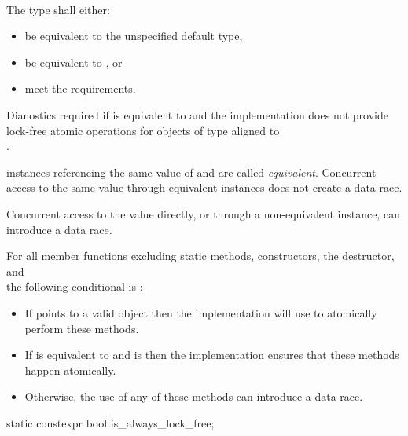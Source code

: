  \\

\begin{addedblock}
\pnum
The type  shall either:
\begin{itemize}
\item be equivalent to the unspecified default type,
\item be equivalent to , or
\item meet the  requirements.
\end{itemize}
Dianostics required if  is equivalent to  
and the implementation does not provide lock-free atomic
operations for objects of type  aligned to \\
.

\pnum
{} instances referencing the same value of  and  are 
called \textit{equivalent}. Concurrent access to the same value through 
equivalent  instances does not create a data race. 
\begin{note} Concurrent access to the value directly, or through a non-equivalent
 instance, can introduce a data race.
\end{note}

\pnum
For all  member functions excluding static methods, constructors, 
the destructor, and \\  the following conditional is :
\begin{itemize}
\item If  points to a valid  object then 
  the implementation will use  to atomically perform these methods.
\item If  is equivalent to  and
   is  then
  the implementation ensures that these methods happen atomically.
\item Otherwise, the use of any of these methods can introduce a data race. 
\end{itemize}
\end{addedblock}

\begin{itemdecl}
static constexpr bool is_always_lock_free;
\end{itemdecl}


